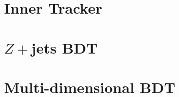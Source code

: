 \documentclass{brandeis-dissertation}
\begin{document}
\clearpage
\begin{singlespacing}


\end{singlespacing}

\clearpage
\appendix
\chapter{Inner Tracker}
\label{sec:ITk}

\chapter{$Z+$jets BDT}
\label{sec:ZjetsBDT}

\chapter{Multi-dimensional BDT}
\label{sec:3DBDT}

\clearpage
\end{document}
